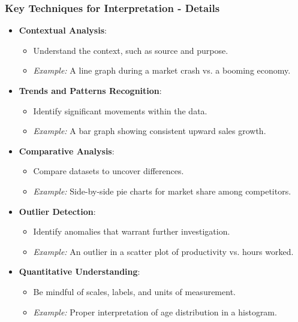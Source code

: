 \documentclass{beamer}
\begin{document}
\begin{frame}[fragile]
    \frametitle{Key Techniques for Interpretation - Details}
    \begin{itemize}
        \item \textbf{Contextual Analysis}:
        \begin{itemize}
            \item Understand the context, such as source and purpose.
            \item \textit{Example:} A line graph during a market crash vs. a booming economy.
        \end{itemize}
        
        \item \textbf{Trends and Patterns Recognition}:
        \begin{itemize}
            \item Identify significant movements within the data.
            \item \textit{Example:} A bar graph showing consistent upward sales growth.
        \end{itemize}
        
        \item \textbf{Comparative Analysis}:
        \begin{itemize}
            \item Compare datasets to uncover differences.
            \item \textit{Example:} Side-by-side pie charts for market share among competitors.
        \end{itemize}
        
        \item \textbf{Outlier Detection}:
        \begin{itemize}
            \item Identify anomalies that warrant further investigation.
            \item \textit{Example:} An outlier in a scatter plot of productivity vs. hours worked.
        \end{itemize}
        
        \item \textbf{Quantitative Understanding}:
        \begin{itemize}
            \item Be mindful of scales, labels, and units of measurement.
            \item \textit{Example:} Proper interpretation of age distribution in a histogram.
        \end{itemize}
    \end{itemize}
\end{frame}
\end{document}
